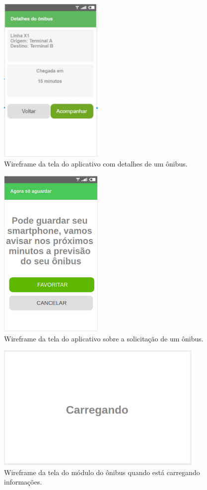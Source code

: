 \documentclass[
	12pt,				%
	oneside,			%
	a4paper,			%
	brazil				%
]{abntex2}
\begin{document}
\begin{apendicesenv}
\begin{figure}[H]
\centering
\includegraphics[width=5cm, center]{images/tela-4-informacoes-do-onibus.PNG}
\caption{Wireframe da tela do aplicativo com detalhes de um ônibus.}
\label{Rotulo}
\end{figure}

\begin{figure}[H]
\centering
\includegraphics[width=5cm, center]{images/tela-5-acompanhamento-do-onibus.PNG}
\caption{Wireframe da tela do aplicativo sobre a solicitação de um ônibus.}
\label{Rotulo}
\end{figure}

\begin{figure}[H]
\centering
\includegraphics[width=10cm, center]{images/busmodule-carregando}
\caption{Wireframe da tela do módulo do ônibus quando está carregando informações.}
\label{Rotulo}
\end{figure}


\end{apendicesenv}
\end{document}
